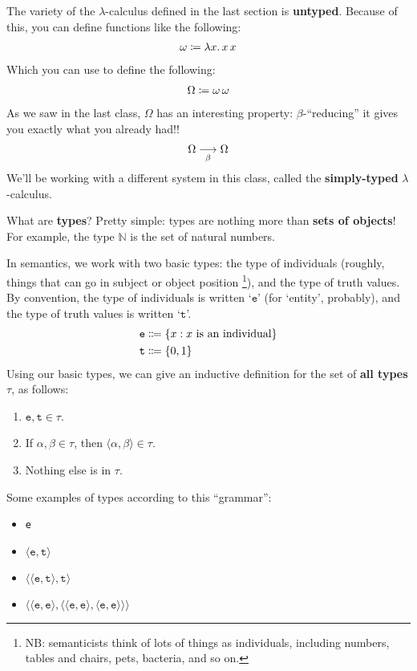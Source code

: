 \documentclass{article}
\newcommand{\set}[1]{\ensuremath{\{ #1 \}}}
\newcommand{\ceq}{\coloneqq}
\newcommand{\ab}[1]{\ensuremath{\langle #1 \rangle}}
\begin{document}
The variety of the $\lambda$-calculus defined in the last section is
\textbf{untyped}. Because of this, you can define functions like the following:
\begin{align}
  \notag
  \omega \ceq \lambda x.\, x\, x
\end{align}
%
Which you can use to define the following:
\begin{align}
  \notag
  \Omega \ceq \omega \, \omega
\end{align}
%
As we saw in the last class, $\Omega$ has an interesting property:
$\beta$-``reducing'' it gives you exactly what you already had!!
\begin{align}
  \notag
  \Omega \underset{\beta}{\longrightarrow} \Omega
\end{align}
%
We'll be working with a different system in this class, called the
\textbf{simply-typed} $\lambda$-calculus.

What are \textbf{types}? Pretty simple: types are nothing more than \textbf{sets
of objects}! For example, the type $\mathbb{N}$ is the set of natural numbers. 

In semantics, we work with two basic types: the type of individuals (roughly,
things that can go in subject or object position%
\footnote{%
  NB\@: semanticists think of lots of things as individuals, including numbers,
  tables and chairs, pets, bacteria, and so on. 
}), and the type of truth values. By convention, the type of individuals is
written `$\texttt{e}$' (for `entity', probably), and the type of truth values is
written `$\texttt{t}$'.
\begin{align}
  \notag
  \texttt{e} & \Coloneqq \set{x : x \text{~is an individual}}
  \\\notag
  \texttt{t} & \Coloneqq \set{0, 1}
\end{align}
%
Using our basic types, we can give an inductive definition for the set of
\textbf{all types} $\tau$, as follows:
\begin{enumerate}
  \item
    $\texttt{e}, \texttt{t} \in \tau$.

  \item
    If $\alpha, \beta \in \tau$, then $\ab{\alpha, \beta} \in \tau$.

  \item
    Nothing else is in $\tau$.
\end{enumerate}

Some examples of types according to this ``grammar'': 
\begin{itemize}
  \item
    \texttt{e}
    
  \item
    \ab{\texttt{e}, \texttt{t}}

  \item 
    \ab{\ab{\texttt{e}, \texttt{t}}, \texttt{t}}

  \item
    \ab{\ab{\texttt{e},\texttt{e}}, \ab{\ab{\texttt{e},\texttt{e}},
    \ab{\texttt{e},\texttt{e}}}}
\end{itemize}
\end{document}
